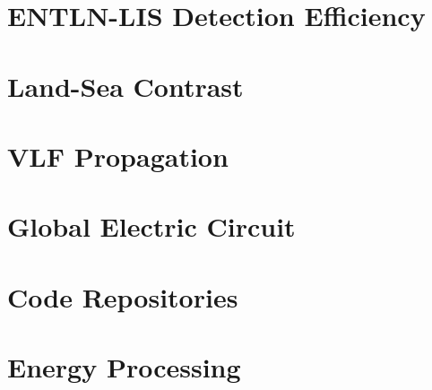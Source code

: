 \documentclass [11pt, twoside] {uwthesis}[2012/06/19]
\begin{document}

\chapter{ENTLN-LIS Detection Efficiency}
\label{thesis:chapter:entln-lis}




\chapter{Land-Sea Contrast}
\label{thesis:chapter:landsea}




\chapter{VLF Propagation}
\label{thesis:chapter:prop}





\chapter{Global Electric Circuit}
\label{thesis:chapter:gec}



%
%





%
%

\appendix
\raggedbottom\sloppy


\chapter{Code Repositories}
\label{thesis:appendix:code}




\chapter{Energy Processing}
\label{thesis:appendix:energy}
\end{document}
